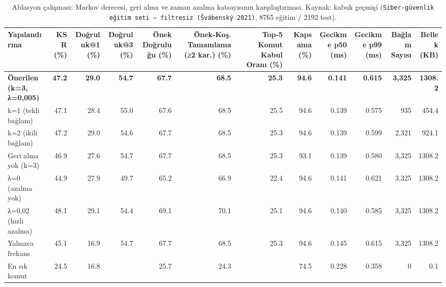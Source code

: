 \begin{table}[htbp]
  \centering
  \caption{Ablasyon çalışması: Markov derecesi, geri alma ve zaman azalma katsayısının karşılaştırması. Kaynak: kabuk geçmişi (\texttt{Siber-güvenlik eğitim seti — filtresiz (Švábenský 2021)}, 8765 eğitim / 2192 test).}
  \label{tab:ablation}
  \begin{tabular}{lrrrrrrrrrrr}
    \toprule
    Yapılandırma & KSR (\%) & Doğruluk@1 (\%) & Doğruluk@3 (\%) & Önek Doğruluğu (\%) & Önek-Koş. Tamamlama (≥2 kar.) (\%) & Top-5 Komut Kabul Oranı (\%) & Kapsama (\%) & Gecikme p50 (ms) & Gecikme p99 (ms) & Bağlam Sayısı & Bellek (KB) \\
    \midrule
    \textbf{Önerilen (k=3, λ=0,005)} & \textbf{47.2} & \textbf{29.0} & \textbf{54.7} & \textbf{67.7} & \textbf{68.5} & \textbf{25.3} & \textbf{94.6} & \textbf{0.141} & \textbf{0.615} & \textbf{3,325} & \textbf{1308.2} \\
    k=1 (tekli bağlam) & 47.1 & 28.4 & 55.0 & 67.6 & 68.5 & 25.5 & 94.6 & 0.139 & 0.575 & 935 & 454.4 \\
    k=2 (ikili bağlam) & 47.2 & 29.0 & 54.6 & 67.7 & 68.5 & 25.3 & 94.6 & 0.139 & 0.599 & 2,321 & 924.1 \\
    Geri alma yok (k=3) & 46.9 & 27.6 & 54.7 & 67.7 & 68.5 & 25.3 & 93.1 & 0.139 & 0.580 & 3,325 & 1308.2 \\
    λ=0 (azalma yok) & 44.9 & 27.9 & 49.7 & 65.2 & 66.9 & 22.4 & 94.6 & 0.141 & 0.621 & 3,325 & 1308.2 \\
    λ=0,02 (hızlı azalma) & 48.1 & 29.1 & 54.4 & 69.1 & 70.1 & 25.1 & 94.6 & 0.140 & 0.585 & 3,325 & 1308.2 \\
    Yalnızca frekans & 45.1 & 16.9 & 54.7 & 67.7 & 68.5 & 25.3 & 94.6 & 0.145 & 0.615 & 3,325 & 1308.2 \\
    En sık komut & 24.5 & 16.8 &  & 25.7 & 24.3 &  & 74.5 & 0.228 & 0.358 & 0 & 0.1 \\
    \bottomrule
  \end{tabular}
\end{table}
